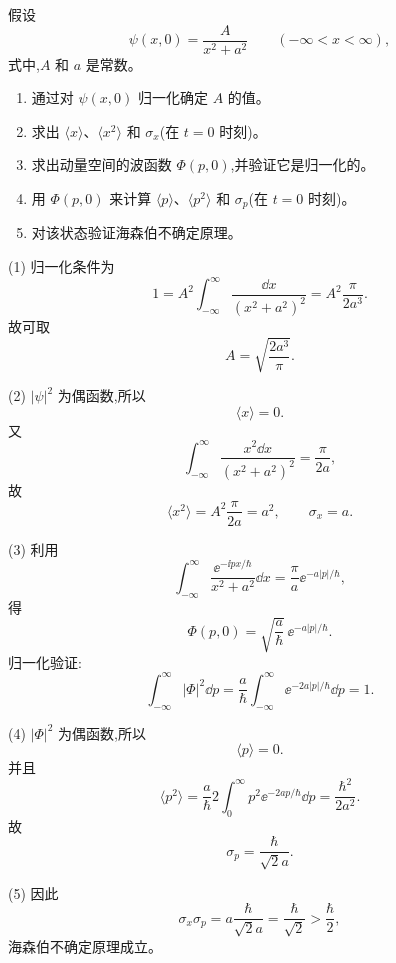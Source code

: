\begin{question}
假设
\[
\psi(x,0)=\frac{A}{x^2+a^2}\qquad(-\infty<x<\infty),
\]
式中,$A$ 和 $a$ 是常数。
\begin{enumerate}
\item 通过对 $\psi(x,0)$ 归一化确定 $A$ 的值。
\item 求出 $\langle x\rangle$、$\langle x^2\rangle$ 和 $\sigma_x$(在 $t=0$ 时刻)。
\item 求出动量空间的波函数 $\Phi(p,0)$,并验证它是归一化的。
\item 用 $\Phi(p,0)$ 来计算 $\langle p\rangle$、$\langle p^2\rangle$ 和 $\sigma_p$(在 $t=0$ 时刻)。
\item 对该状态验证海森伯不确定原理。
\end{enumerate}
\begin{solution}
(1) 归一化条件为
\[
1=A^2\int_{-\infty}^{\infty}\frac{\dd x}{(x^2+a^2)^2}
=A^2\frac{\pi}{2a^3}.
\]
故可取
\[
\boxed{A=\sqrt{\frac{2a^3}{\pi}}.}
\]

(2) $|\psi|^2$ 为偶函数,所以
\[
\langle x\rangle=0.
\]
又
\[
\int_{-\infty}^{\infty}\frac{x^2\dd x}{(x^2+a^2)^2}=\frac{\pi}{2a},
\]
故
\[
\langle x^2\rangle=A^2\frac{\pi}{2a}=a^2,
\qquad
\boxed{\sigma_x=a.}
\]

(3) 利用
\[
\int_{-\infty}^{\infty}\frac{\ee^{-\ii px/\hbar}}{x^2+a^2}\dd x
=\frac\pi a \ee^{-a|p|/\hbar},
\]
得
\[
\boxed{\Phi(p,0)=\sqrt{\frac a\hbar}\,\ee^{-a|p|/\hbar}.}
\]
归一化验证:
\[
\int_{-\infty}^{\infty}|\Phi|^2\dd p
=\frac a\hbar\int_{-\infty}^{\infty}\ee^{-2a|p|/\hbar}\dd p=1.
\]

(4) $|\Phi|^2$ 为偶函数,所以
\[
\langle p\rangle=0.
\]
并且
\[
\langle p^2\rangle=\frac a\hbar 2\int_0^\infty p^2\ee^{-2ap/\hbar}\dd p
=\frac{\hbar^2}{2a^2}.
\]
故
\[
\boxed{\sigma_p=\frac{\hbar}{\sqrt2a}.}
\]

(5) 因此
\[
\sigma_x\sigma_p=a\frac{\hbar}{\sqrt2a}=\frac\hbar{\sqrt2}>\frac\hbar2,
\]
海森伯不确定原理成立。
\end{solution}
\end{question}

